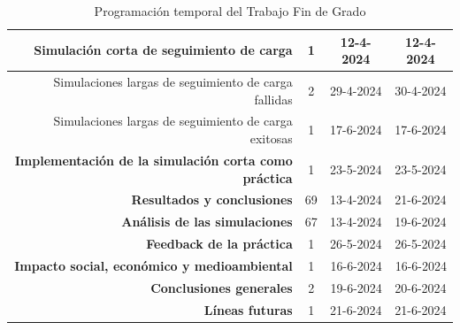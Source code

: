 \begin{table}[!h]
\begin{tabular}{|r|c|c|c|}
    \rowcolor[HTML]{ECF4FF} 
    Simulación corta de seguimiento de carga                     & 1                         & 12-4-2024                         & \cellcolor[HTML]{ECF4FF}12-4-2024 \\ \hline
    \rowcolor[HTML]{ECF4FF} 
    Simulaciones largas de seguimiento de carga fallidas         & 2                         & 29-4-2024                         & 30-4-2024                         \\ \hline
    \rowcolor[HTML]{ECF4FF} 
    Simulaciones largas de seguimiento de carga exitosas &
      1 &
      17-6-2024 &
      \cellcolor[HTML]{ECF4FF}17-6-2024 \\ \hline
    \rowcolor[HTML]{CBE5CB} 
    \textbf{Implementación de la simulación corta como práctica} & 1                         & 23-5-2024                         & 23-5-2024                         \\ \hline
    \rowcolor[HTML]{FFCE93} 
    \textbf{Resultados y conclusiones}                           & 69                        & 13-4-2024                         & 21-6-2024                         \\ \hline
    \rowcolor[HTML]{CBE5CB} 
    \textbf{Análisis de las simulaciones}                        & 67                        & 13-4-2024                         & 19-6-2024                         \\ \hline
    \rowcolor[HTML]{CBE5CB} 
    \textbf{Feedback de la práctica}                             & 1                         & 26-5-2024                         & 26-5-2024                         \\ \hline
    \rowcolor[HTML]{CBE5CB} 
    \textbf{Impacto social, económico y medioambiental} &
      \cellcolor[HTML]{CBE5CB}1 &
      \multicolumn{1}{r|}{\cellcolor[HTML]{CBE5CB}16-6-2024} &
      \multicolumn{1}{r|}{\cellcolor[HTML]{CBE5CB}16-6-2024} \\ \hline
    \rowcolor[HTML]{CBE5CB} 
    \textbf{Conclusiones generales} &
      \cellcolor[HTML]{CBE5CB}2 &
      \multicolumn{1}{r|}{\cellcolor[HTML]{CBE5CB}19-6-2024} &
      \cellcolor[HTML]{CBE5CB}20-6-2024 \\ \hline
    \rowcolor[HTML]{CBE5CB} 
    \textbf{Líneas futuras}                                      & \cellcolor[HTML]{CBE5CB}1 & \cellcolor[HTML]{CBE5CB}21-6-2024 & 21-6-2024                         \\ \hline
    \end{tabular}
    \caption{Programación temporal del Trabajo Fin de Grado}
    \label{tab:progamacion_temporal_tfg}
    \end{table}

